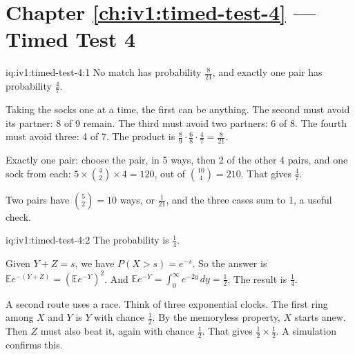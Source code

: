 \section*{Chapter \ref{ch:iv1:timed-test-4} --- Timed Test 4}

\begin{solution}{iq:iv1:timed-test-4:1}
No match has probability $\frac{8}{21}$, and exactly one pair has probability $\frac47$.

Taking the socks one at a time, the first can be anything. The second must avoid its partner: 8 of 9 remain. The third must avoid two partners: 6 of 8. The fourth must avoid three: 4 of 7. The product is $\frac89 \cdot \frac68 \cdot \frac47 = \frac{8}{21}$.

Exactly one pair: choose the pair, in 5 ways, then 2 of the other 4 pairs, and one sock from each: $5 \times \binom42 \times 4 = 120$, out of $\binom{10}{4} = 210$. That gives $\frac47$.

Two pairs have $\binom52 = 10$ ways, or $\frac{1}{21}$, and the three cases sum to 1, a useful check.

\end{solution}

\begin{solution}{iq:iv1:timed-test-4:2}
The probability is $\frac14$.

Given $Y + Z = s$, we have $P(X > s) = e^{-s}$. So the answer is $\mathbb{E}e^{-(Y + Z)} = (\mathbb{E}e^{-Y})^2$. And $\mathbb{E}e^{-Y} = \int_0^\infty e^{-2y}\,dy = \frac12$. The result is $\frac14$.

A second route uses a race. Think of three exponential clocks. The first ring among $X$ and $Y$ is $Y$ with chance $\frac12$. By the memoryless property, $X$ starts anew. Then $Z$ must also beat it, again with chance $\frac12$. That gives $\frac12 \times \frac12$. A simulation confirms this.

\end{solution}

